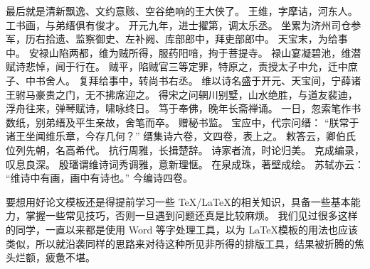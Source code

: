 \documentclass[../Main/thesis.tex]{subfiles}
\begin{document}
最后就是清新飘逸、文约意赅、空谷绝响的王大侠了。
王维，字摩诘，河东人。
工书画，与弟缙俱有俊才。
开元九年，进士擢第，调太乐丞。
坐累为济州司仓参军，历右拾遗、监察御史、左补阙、库部郎中，拜吏部郎中。
天宝末，为给事中。
安禄山陷两都，维为贼所得，服药阳喑，拘于菩提寺。
禄山宴凝碧池，维潜赋诗悲悼，闻于行在。
贼平，陷贼官三等定罪，特原之，责授太子中允，迁中庶子、中书舍人。
复拜给事中，转尚书右丞。
维以诗名盛于开元、天宝间，宁薛诸王驸马豪贵之门，无不拂席迎之。
得宋之问辋川别墅，山水绝胜，与道友裴迪，浮舟往来，弹琴赋诗，啸咏终日。
笃于奉佛，晚年长斋禅诵。
一日，忽索笔作书数纸，别弟缙及平生亲故，舍笔而卒。
赠秘书监。
宝应中，代宗问缙：
“朕常于诸王坐闻维乐章，今存几何？”
缙集诗六卷，文四卷，表上之。
敕答云，卿伯氏位列先朝，名高希代。
抗行周雅，长揖楚辞。
诗家者流，时论归美。
克成编录，叹息良深。
殷璠谓维诗词秀调雅，意新理惬。
在泉成珠，著壁成绘。
苏轼亦云：
“维诗中有画，画中有诗也。”
今编诗四卷。

要想用好论文模板还是得提前学习一些 \TeX/\LaTeX{}的相关知识，具备一些基本能力，掌握一些常见技巧，否则一旦遇到问题还真是比较麻烦。
我们见过很多这样的同学，一直以来都是使用 Word 等字处理工具，以为 \LaTeX{}模板的用法也应该类似，所以就沿袭同样的思路来对待这种所见非所得的排版工具，结果被折腾的焦头烂额，疲惫不堪。
\end{document}
